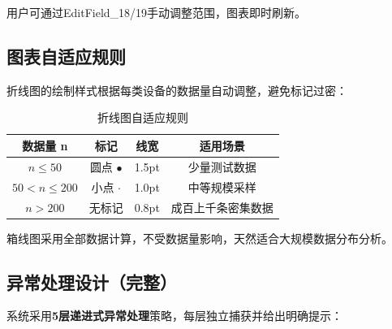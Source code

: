 \documentclass[12pt,a3paper]{ctexart}
\begin{document}
用户可通过EditField\_18/19手动调整范围，图表即时刷新。

\subsection{图表自适应规则}

折线图的绘制样式根据每类设备的数据量自动调整，避免标记过密：

\begin{table}[H]
\centering
\caption{折线图自适应规则}
\begin{tabular}{c|c|c|c}
\toprule
\textbf{数据量 n} & \textbf{标记} & \textbf{线宽} & \textbf{适用场景} \\
\midrule
$n \leq 50$ & 圆点 $\bullet$ & 1.5pt & 少量测试数据 \\
$50 < n \leq 200$ & 小点 $\cdot$ & 1.0pt & 中等规模采样 \\
$n > 200$ & 无标记 & 0.8pt & 成百上千条密集数据 \\
\bottomrule
\end{tabular}
\end{table}

箱线图采用全部数据计算，不受数据量影响，天然适合大规模数据分布分析。

\subsection{异常处理设计（完整）}

系统采用\textbf{5层递进式异常处理}策略，每层独立捕获并给出明确提示：
\end{document}
